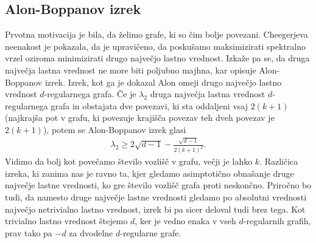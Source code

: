 \subsection{Alon-Boppanov izrek}
Prvotna motivacija je bila, da želimo grafe, ki so čim bolje povezani. Cheegerjeva neenakost je pokazala, da je upravičeno, da poskušamo maksimizirati spektralno vrzel oziroma minimizirati drugo največjo lastno vrednost. Izkaže pa se, da druga največja lastna vrednost ne more biti poljubno majhna, kar opisuje Alon-Boppanov izrek. Izrek, kot ga je dokazal Alon omeji drugo največjo lastno vrednost \(d\)-regularnega grafa. Če je \(\lambda_2\) druga največja lastna vrednost \(d\)-regularnega grafa in obstajata dve povezavi, ki sta oddaljeni vsaj \(2(k+1)\) (najkrajša pot v grafu, ki povezuje krajišča povezav teh dveh povezav je \(2(k+1)\)), potem se Alon-Boppanov\cite{alon-boppana-original} izrek glasi 
\begin{align*}
    \lambda_2 \geq 2\sqrt{d-1} - \frac{\sqrt{d-1}}{2(k+1)^2}.
\end{align*}
Vidimo da bolj kot povečamo število vozlišč v grafu, večji je lahko \(k\). Različica izreka, ki zanima nas je ravno ta, kjer gledamo asimptotično obnašanje druge največje lastne vrednosti, ko gre število vozlišč grafa proti neskončno. Priročno bo tudi, da namesto druge največje lastne vrednosti gledamo po absolutni vrednosti največjo netrivialno lastno vrednost, izrek bi pa sicer deloval tudi brez tega. Kot trivialno lastno vrednost štejemo \(d\), ker je vedno enaka v vseh \(d\)-regularnih grafih, prav tako pa \(-d\) za dvodelne \(d\)-regularne grafe\cite{lps-ramanujan}.

